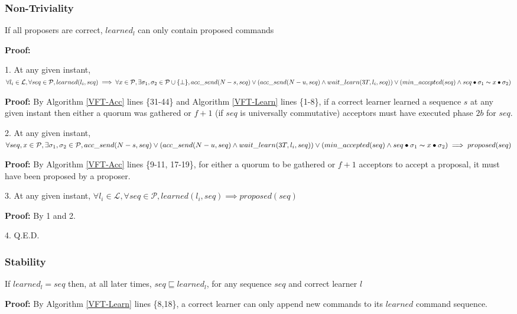 \subsubsection{Non-Triviality}
\begin{theorem}
If all proposers are correct, $learned_l$ can only contain proposed commands \label{N-T1} \par
\end{theorem} 
\textbf{Proof:} \par
\parbox{\linewidth}{\strut1. At any given instant, $\forall l_i \in \mathcal{L}, \forall seq \in \mathcal{P}, learned(l_i,seq) \implies \forall x \in \mathcal{P}, \exists \sigma_1,\sigma_2 \in \mathcal{P} \cup \{\bot\},  acc\_send(N-s, seq) \lor (acc\_send(N-u, seq) \land wait\_learn(3T,l_i,seq)) \lor (min\_accepted(seq) \land seq \bullet \sigma_1 \thicksim x \bullet \sigma_2)$ }\par
\indent\indent\parbox{\linewidth}{\strut\textbf{Proof:} By Algorithm \ref{VFT-Acc} lines \{31-44\} and Algorithm \ref{VFT-Learn} lines \{1-8\}, if a correct learner learned a sequence $s$ at any given instant then either a quorum was gathered or $f+1$ (if $seq$ is universally commutative) acceptors must have executed phase $2b$ for $seq$.}\par
\parbox{\linewidth}{\strut2. At any given instant, $\forall seq,x \in \mathcal{P}, \exists \sigma_1,\sigma_2 \in \mathcal{P}, acc\_send(N-s, seq) \lor (acc\_send(N-u, seq) \land wait\_learn(3T,l_i,seq)) \lor  (min\_accepted(seq) \land seq \bullet \sigma_1 \thicksim x \bullet \sigma_2) \implies proposed(seq)$ }\par
\indent\indent\parbox{\linewidth}{\strut\textbf{Proof:} By Algorithm \ref{VFT-Acc} lines \{9-11, 17-19\}, for either a quorum to be gathered or $f+1$ acceptors to accept a proposal, it must have been proposed by a proposer.}\par
\parbox{\linewidth}{\strut3. At any given instant, $\forall l_i \in \mathcal{L},\forall seq \in \mathcal{P}, learned(l_i,seq) \implies proposed(seq)$}\par
\indent\indent\parbox{\linewidth}{\strut\textbf{Proof:} By 1 and 2.}\par
\parbox{\linewidth}{\strut4. Q.E.D.}\par

\subsubsection{Stability}
\begin{theorem}
If $learned_l = seq$ then, at all later times, $seq \sqsubseteq learned_l$, for any sequence $seq$ and correct learner $l$ \par \label{S-T1}
\end{theorem} 
\textbf{Proof:} By Algorithm \ref{VFT-Learn} lines \{8,18\}, a correct learner can only append new commands to its $learned$ command sequence.

